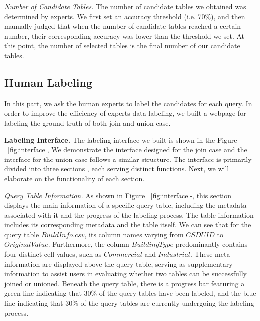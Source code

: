 \noindent  \underline{\textit{Number of Candidate Tables.}}  The number of candidate tables we obtained was determined by experts. We first set an accuracy threshold (i.e. 70\%), and then manually judged that when the number of candidate tables reached a certain number, their corresponding accuracy was lower than the threshold we set. At this point, the number of selected tables is the final number of our candidate tables.


\subsection{Human Labeling}
In this part, we ask the human experts to label the candidates for each query. In order to improve the efficiency of experts data labeling, we built a webpage for labeling the ground truth of both join and union case.


\noindent \textbf{Labeling Interface.} 
The labeling interface we built is shown in the Figure ~\ref{fig:interface}, We demonstrate the interface designed for the join case and the interface for the union case follows a similar structure. The interface is primarily divided into three sections , each serving distinct functions. Next, we will elaborate on the functionality of each section.

\noindent \underline{\textit{Query Table Information.}}  
As shown in Figure ~\ref{fig:interface}-, this section 
displays the main information of a specific query table, including the metadata associated with it and the progress of the labeling process. The table information  includes its corresponding metadata and the table itself. We can see that for the query table $BuildInfo.csv$, its column names varying from $CSDUID$ to $OriginalValue$. Furthermore, the column $Building Type$ predominantly contains four distinct cell values, such as $Commercial$ and $Industrial$. These meta information are displayed above the query table, serving as supplementary information to assist users in  evaluating whether two tables can be successfully joined or unioned. Beneath the query table, there is a progress bar featuring a green line indicating that 30\% of the query tables have been labeled, and the blue line indicating that 30\% of the query tables are currently undergoing the labeling process.

